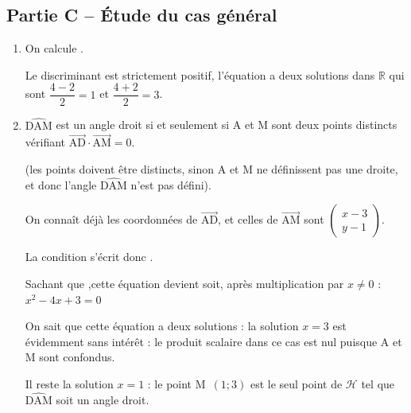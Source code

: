 \documentclass[10pt]{article}
\providecommand{\R}{\mathbb{R}}
\providecommand{\vectt}[1]{\overrightarrow{\mathrm{#1}}}
\begin{document}
\subsection*{Partie C -- Étude du cas général}

	\begin{enumerate}
		\item On calcule .

		Le discriminant est strictement positif, l'équation a deux solutions dans $\R$ qui sont {$\dfrac{4-2}{2}=1$} et {$\dfrac{4+2}{2}=3$}.

		\item $\widehat{\text{DAM}}$ est un angle droit si et seulement si A et M sont deux points distincts vérifiant {$\vectt{AD}\cdot\vectt{AM}=0$}.

		(les points doivent être distincts, sinon A et M ne définissent pas une droite, et donc l'angle $\widehat{\text{DAM}}$ n'est pas défini).

		On connaît déjà les coordonnées de {$\vectt{AD}$}, et celles de {$\vectt{AM}$} sont {$\left(\begin{array}{c}x-3\\ y-1\end{array}\right)$.}

		La condition s'écrit donc .

		Sachant que ,\quad cette équation devient  \quad soit, après multiplication par $x\neq0$ :
		\quad
		{$x^2-4x+3=0$}

		On sait que cette équation a deux solutions : la solution $x=3$ est évidemment sans intérêt : le produit scalaire dans ce cas est nul puisque A et M sont confondus.

		Il reste la solution $x=1$ : le point {M~$(1;3)$} est le seul point de {$\mathcal{H}$} tel que $\widehat{\text{DAM}}$ soit un angle droit.
	\end{enumerate}
\end{document}
